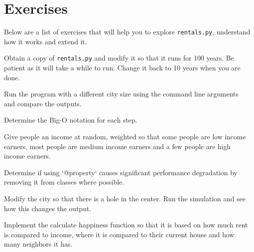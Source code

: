 \section{Exercises}

\par
Below are a list of exercises that will help you to explore \texttt{rentals.py},  understand how it works and extend it.

\begin{excercise}
Obtain a copy of \texttt{rentals.py} and modify it so that it runs for 100 years. Be patient as it will take a while to run. Change it back to 10 years when you are done.
\end{excercise}

\begin{excercise}
Run the program with a different city size using the command line arguments and compare the outputs.
\end{excercise}

\begin{excercise}
Determine the Big-O notation for each step.
\end{excercise}

\begin{excercise}
Give people an income at random, weighted so that some people are low income earners, most people are medium income earners and a few people are high income earners.
\end{excercise}

\begin{excercise}
Determine if using `@property` causes significant performance degradation by removing it from classes where possible.
\end{excercise}

\begin{excercise}
Modify the city so that there is a hole in the center. Run the simulation and see how this changes the output.
\end{excercise}

\begin{excercise}
Implement the calculate happiness function so that it is based on how much rent is compared to income, where it is compared to their current house and how many neighbors it has.
\end{excercise}